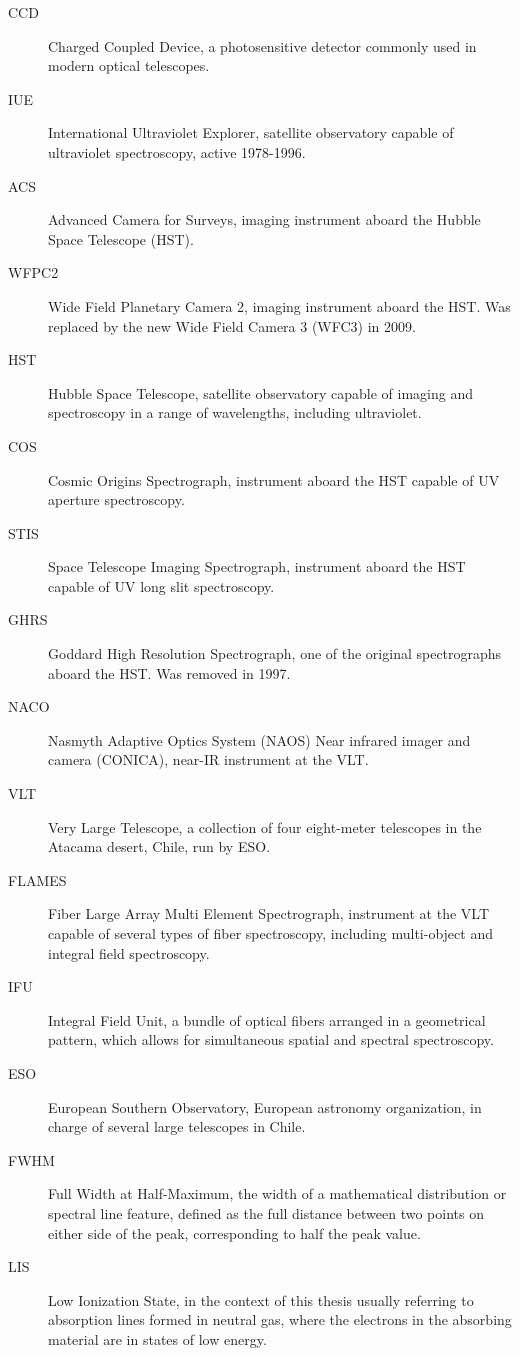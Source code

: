 \documentclass[a4wide,12pt]{book}
\begin{document}
{\begin{description}
\item[CCD]
Charged Coupled Device, a photosensitive detector commonly used in modern optical telescopes.
\item[IUE]
International Ultraviolet Explorer, satellite observatory capable of ultraviolet spectroscopy, active 1978-1996.
\item[ACS] 
Advanced Camera for Surveys, imaging instrument aboard the Hubble Space Telescope (HST).
\item[WFPC2]
Wide Field Planetary Camera 2, imaging instrument aboard the HST. Was replaced by the new Wide Field Camera 3 (WFC3) in 2009.
\item[HST]
Hubble Space Telescope, satellite observatory capable of imaging and spectroscopy in a range of wavelengths, including ultraviolet.
\item[COS]
Cosmic Origins Spectrograph, instrument aboard the HST capable of UV aperture spectroscopy.
\item[STIS]
Space Telescope Imaging Spectrograph, instrument aboard the HST capable of UV long slit spectroscopy.
\item[GHRS] 
Goddard High Resolution Spectrograph, one of the original spectrographs aboard the HST. Was removed in 1997.
\item[NACO] 
Nasmyth Adaptive Optics System (NAOS) Near infrared imager and camera (CONICA), near-IR instrument at the VLT.
\item[VLT] 
Very Large Telescope, a collection of four eight-meter telescopes in the Atacama desert, Chile, run by ESO. 
\item[FLAMES]
Fiber Large Array Multi Element Spectrograph, instrument at the VLT capable of several types of fiber spectroscopy, including multi-object and integral field spectroscopy. 
\item[IFU]
Integral Field Unit, a bundle of optical fibers arranged in a geometrical pattern, which allows for simultaneous spatial and spectral spectroscopy.
\item[ESO] 
European Southern Observatory, European astronomy organization, in charge of several large telescopes in Chile. 
\item[FWHM] 
Full Width at Half-Maximum, the width of a mathematical distribution or spectral line feature, defined as the full distance between two points on either side of the peak, corresponding to half the peak value.
\item[LIS]
Low Ionization State, in the context of this thesis usually referring to absorption lines formed in neutral gas, where the electrons in the absorbing material are in states of low energy.

\end{description}}
\end{document}
